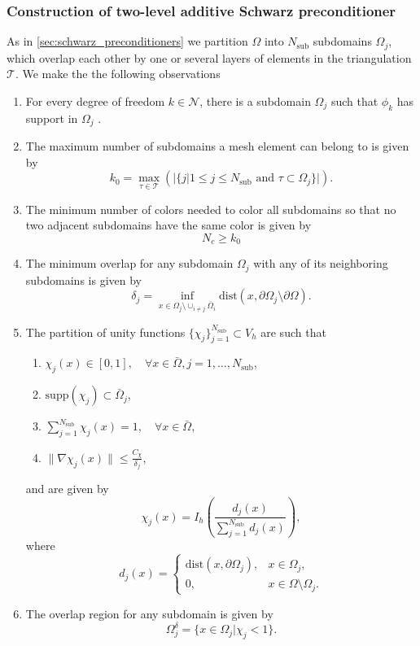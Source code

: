 \subsubsection{Construction of two-level additive Schwarz preconditioner}
As in \cref{sec:schwarz_preconditioners} we partition $\Omega$ into $N_{\text{sub}}$ subdomains $\Omega_j$, which overlap each other by one or several layers of elements in the triangulation $\mathcal{T}$. We make the the following observations
\begin{enumerate}[label=\textbf{D\arabic*}, ref=\textbf{D\arabic*}]
  \item\label{ASM_observation:basis_inclusion} For every degree of freedom $k\in\mathcal{N}$, there is a subdomain $\Omega_j$ such that $\phi_k$ has support in $\Omega_j$ \cite[Lemma 5.3]{schwarz_methods_Dolean_2015}.
  \item\label{ASM_observation:multiplicity_of_intersections} The maximum number of subdomains a mesh element can belong to is given by
  \[
    k_0 = \max_{\tau\in\mathcal{T}} \left (|\{j|1\leq j\leq N_{\text{sub}} \text{ and } \tau \subset \Omega_j\}| \right).
  \]
  \item\label{ASM_observation:number_of_colors} The minimum number of colors needed to color all subdomains so that no two adjacent subdomains have the same color is given by
  \[
    N_c \geq k_0
  \]
  \item\label{ASM_observation:overlapping_parameter} The minimum overlap for any subdomain $\Omega_j$ with any of its neighboring subdomains is given by
  \[
    \delta_j = \inf_{x\in\Omega_j\setminus\cup_{i\neq j} \bar{\Omega}_i} \text{dist}(x, \partial \Omega_j\setminus\partial \Omega).
  \]
  \item\label{ASM_observation:partition_of_unity} The partition of unity functions $\{\chi_j\}_{j=1}^{N_{\text{sub}}}\subset V_h$ are such that
  \begin{enumerate}[label*=.\alph*]
    \item $\chi_j(x) \in [0,1], \quad \forall x\in\bar{\Omega}, j=1,\ldots,N_{\text{sub}}$,
    \item $\text{supp}(\chi_j) \subset \bar{\Omega}_j$,
    \item $\sum_{j=1}^{N_{\text{sub}}} \chi_j(x) = 1, \quad \forall x\in\bar{\Omega}$,
    \item $\|\nabla\chi_j(x)\| \leq \frac{C_{\chi}}{\delta_j}$,
  \end{enumerate}
  and are given by
  \[
    \chi_j(x) = I_h\left(\frac{d_j(x)}{\sum_{j=1}^{N_{\text{sub}}} d_j(x)}\right),
  \]
  where
  \[
    d_j(x) =
    \begin{cases}
      \text{dist}(x, \partial \Omega_j), & x\in\Omega_j,                \\
      0,                                 & x\in\Omega\setminus\Omega_j.
    \end{cases}
  \]
  \item\label{ASM_observation:overlap_region} The overlap region for any subdomain is given by
  \[
    \Omega_j^{\delta} = \{x\in\Omega_j| \chi_j < 1\}.
  \]
\end{enumerate}
